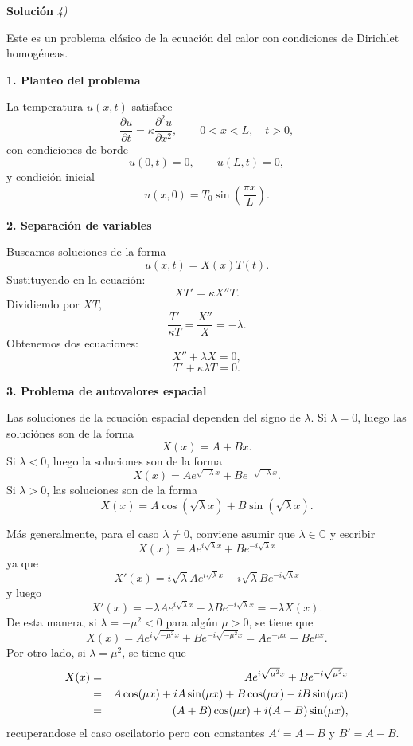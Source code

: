 \documentclass[11pt,spanish]{article}
\newcommand{\CC}{\mathbb{C}}
\newcounter{problema}
\begin{document}
\vspace{0.5cm}
{\bf Soluci\'on }{\em 4)}
\vspace{0.5cm}

Este es un problema clásico de la ecuación del calor con condiciones de Dirichlet homogéneas.

{\bf 1. Planteo del problema}

La temperatura $u(x,t)$ satisface
$$
\frac{\partial u}{\partial t}
=
\kappa \frac{\partial^2 u}{\partial x^2},
\qquad 0<x<L,\quad t>0,
$$
con condiciones de borde
$$
u(0,t)=0,
\qquad
u(L,t)=0,
$$
y condición inicial
$$
u(x,0)=T_0\sin\left(\frac{\pi x}{L}\right).
$$

{\bf 2. Separación de variables}

Buscamos soluciones de la forma
$$
u(x,t)=X(x)T(t).
$$
Sustituyendo en la ecuación:
$$
XT'
=
\kappa X''T.
$$
Dividiendo por $XT$,
$$
\frac{T'}{\kappa T}
=
\frac{X''}{X}
=
-\lambda.
$$
Obtenemos dos ecuaciones:
$$
X''+\lambda X=0,
$$
$$
T'+\kappa\lambda T=0.
$$

{\bf 3. Problema de autovalores espacial}

Las soluciones de la ecuaci\'on espacial dependen del signo de $\lambda$.
Si $\lambda=0$, luego las soluci\'ones son de la forma
$$
X(x) = A+Bx.
$$
Si $\lambda<0$, luego la soluciones son de la forma
$$
X(x)
=
Ae^{\sqrt{-\lambda}x}
+
Be^{-\sqrt{-\lambda}x}
.
$$
Si $\lambda>0$, las soluciones son de la forma
$$
X(x)
=
A\cos(\sqrt{\lambda}x)
+
B\sin(\sqrt{\lambda}x).
$$

M\'as generalmente, para el caso $\lambda\neq 0$, conviene asumir que $\lambda\in \CC$ y escribir
$$
X(x)
=
A
e^{i\sqrt{\lambda}x}
+
B
e^{-i\sqrt{\lambda}x}
$$
ya que
$$
X'(x)
=
i\sqrt{\lambda}
A
e^{i\sqrt{\lambda}x}
-
i\sqrt{\lambda}
B
e^{-i\sqrt{\lambda}x}
$$
y luego
$$
X'(x)
=
-
\lambda
A
e^{i\sqrt{\lambda}x}
-
\lambda
B
e^{-i\sqrt{\lambda}x}
=
-
\lambda
X(x)
.
$$
De esta manera, si $\lambda=-\mu^2<0$ para alg\'un $\mu>0$, se tiene que
$$
X(x)
=
A
e^{i\sqrt{-\mu^2}x}
+
B
e^{-i\sqrt{-\mu^2}x}
=
A
e^{-\mu x}
+
B
e^{\mu x}
.
$$
Por otro lado, si $\lambda=\mu^2$, se tiene que
\begin{eqnarray}
X(x)
&=&
A
e^{i\sqrt{\mu^2}x}
+
B
e^{-i\sqrt{\mu^2}x}
\notag
\\
&=&
A
\cos(\mu x)
+
iA
\sin(\mu x)
+
B
\cos(\mu x)
-
iB
\sin(\mu x)
\notag
\\
&=&
(A+B)
\cos(\mu x)
+
i(A-B)
\sin(\mu x)
\notag
,
\end{eqnarray}
recuperandose el caso oscilatorio pero con constantes $A'=A+B$ y $B'=A-B$.
\end{document}
